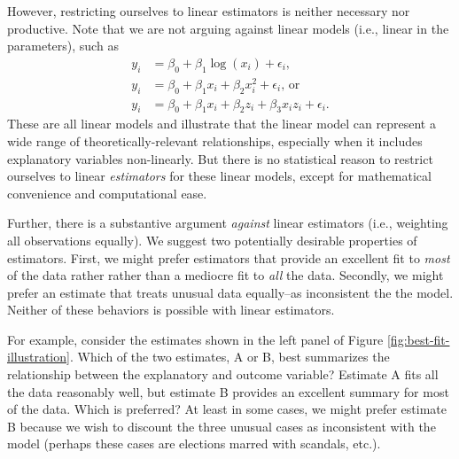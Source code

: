 \documentclass[12pt]{article}
\begin{document}
However, restricting ourselves to linear estimators is neither necessary nor productive. 
Note that we are not arguing against linear models (i.e., linear in the parameters), such as 
\begin{align*}
y_i &= \beta_0 + \beta_1\log(x_i) + \epsilon_i\text{,}\\
y_i &= \beta_0 + \beta_1x_i + \beta_2x_i^2 + \epsilon_i\text{, or}\\ 
y_i &= \beta_0 + \beta_1x_i + \beta_2z_i + \beta_3x_iz_i + \epsilon_i\textit{.}
\end{align*}
These are all linear models and illustrate that the linear model can represent a wide range of theoretically-relevant relationships, especially when it includes explanatory variables non-linearly. 
But there is no statistical reason to restrict ourselves to linear \textit{estimators} for these linear models, except for mathematical convenience and computational ease.

Further, there is a substantive argument \textit{against} linear estimators (i.e., weighting all observations equally). 
We suggest two potentially desirable properties of estimators. 
First, we might prefer estimators that provide an excellent fit to \textit{most} of the data rather rather than a mediocre fit to \textit{all} the data. 
Secondly, we might prefer an estimate that treats unusual data equally--as inconsistent the the model.
Neither of these behaviors is possible with linear estimators.

For example, consider the estimates shown in the left panel of Figure \ref{fig:best-fit-illustration}. 
Which of the two estimates, A or B, best summarizes the relationship between the explanatory and outcome variable? 
Estimate A fits all the data reasonably well, but estimate B provides an excellent summary for most of the data. 
Which is preferred? 
At least in some cases, we might prefer estimate B because we wish to discount the three unusual cases as inconsistent with the model (perhaps these cases are elections marred with scandals, etc.).
\end{document}
